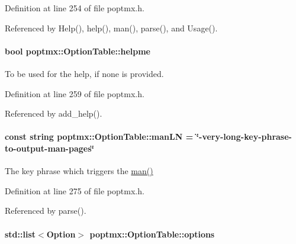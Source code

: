 Definition at line 254 of file poptmx.h.



Referenced by Help(), help(), man(), parse(), and Usage().

\hypertarget{classpoptmx_1_1OptionTable_aed7f2317e288f87f851e6f78d16bc734}{
\paragraph[{helpme}]{\setlength{\rightskip}{0pt plus 5cm}bool {\bf poptmx::OptionTable::helpme}}\hfill}
\label{classpoptmx_1_1OptionTable_aed7f2317e288f87f851e6f78d16bc734}


To be used for the help, if none is provided. 



Definition at line 259 of file poptmx.h.



Referenced by add\_\-help().

\hypertarget{classpoptmx_1_1OptionTable_a22f4a6d7722fedd31d7e51387945c7f5}{
\paragraph[{manLN}]{\setlength{\rightskip}{0pt plus 5cm}const string {\bf poptmx::OptionTable::manLN} = \char`\"{}-\/very-\/long-\/key-\/phrase-\/to-\/output-\/man-\/pages\char`\"{}}\hfill}
\label{classpoptmx_1_1OptionTable_a22f4a6d7722fedd31d7e51387945c7f5}


The key phrase which triggers the \hyperlink{classpoptmx_1_1OptionTable_ac87bd15ce01d4629fb70e28d71393b2b}{man()} 



Definition at line 275 of file poptmx.h.



Referenced by parse().

\hypertarget{classpoptmx_1_1OptionTable_aaeb4410c92cd7d688b2b41821403d6ef}{
\paragraph[{options}]{\setlength{\rightskip}{0pt plus 5cm}std::list$<${\bf Option}$>$ {\bf poptmx::OptionTable::options}}\hfill}
\label{classpoptmx_1_1OptionTable_aaeb4410c92cd7d688b2b41821403d6ef}


